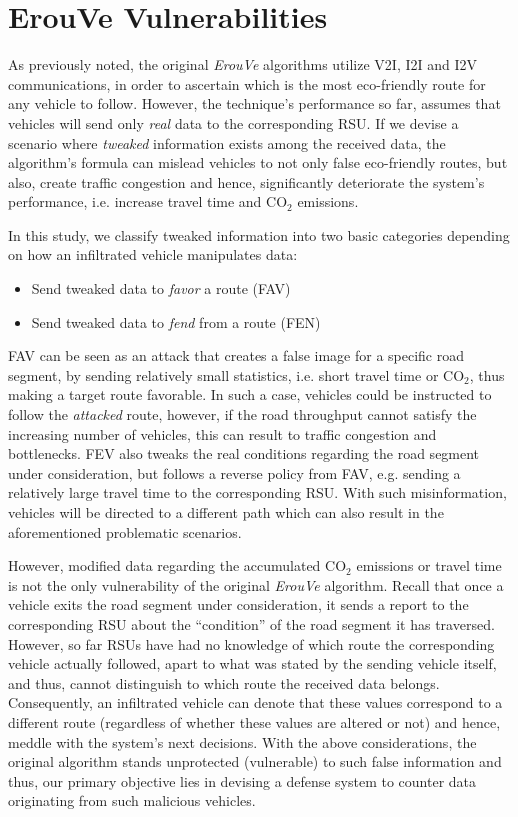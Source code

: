 \documentclass[conference]{IEEEtran}
\begin{document}
\section{ErouVe Vulnerabilities}
\label{erouve-vulnerabilitues}
As previously noted, the original {\it ErouVe} algorithms utilize V2I, I2I and I2V communications, in order to ascertain which is the most eco-friendly route
for any vehicle to follow. However, the technique's performance so far, assumes that vehicles will send only {\it real} data to the corresponding
RSU. If we devise a scenario where {\it tweaked} information exists among the received data, the algorithm's formula can mislead vehicles to not only
false eco-friendly routes, but also, create traffic congestion and hence, significantly deteriorate the system's performance, i.e. increase travel time and 
CO$_2$ emissions.


In this study, we classify tweaked information into two basic categories depending on how an infiltrated vehicle manipulates data: 

\begin{itemize}
\item Send tweaked data to {\it favor} a route (FAV)
\item Send tweaked data to {\it fend} from a route (FEN)
\end{itemize}

FAV can be seen as an attack that creates a false image for a specific road segment, by sending relatively 
small statistics, i.e. short travel time or CO$_2$, thus making a target route favorable. In such a case, vehicles could be instructed to follow the {\it attacked} 
route,  however, if the road throughput cannot satisfy the increasing number of vehicles, this can result to traffic congestion and bottlenecks. 
FEV also tweaks the real conditions regarding the road segment under consideration, but follows a reverse policy from FAV, e.g. sending a relatively 
large travel time to the corresponding RSU. With such misinformation, vehicles will be directed to a different path which can also result in the aforementioned 
problematic scenarios.

However, modified data regarding the accumulated CO$_2$ emissions or travel time is not the only vulnerability of the original {\it ErouVe} algorithm.  Recall 
that once a vehicle exits the road segment under consideration, it sends a report  to the corresponding RSU about the ``condition'' of the road segment it has traversed.
However, so far RSUs have had no knowledge of which route the corresponding vehicle actually followed, apart to what was stated by the sending vehicle itself,
and thus, cannot distinguish to which route the received data belongs.  Consequently, an infiltrated vehicle can denote that these values correspond to a different route 
(regardless of whether these  values are altered or not) and hence, meddle with the system's next decisions.
With the above considerations, the original algorithm stands unprotected (vulnerable) to such false information and thus, our primary objective lies in devising a defense system
to counter data originating from such malicious vehicles.
\end{document}
